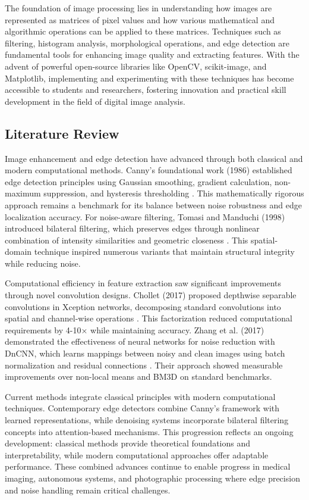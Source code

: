 \documentclass[a4paper, journal]{IEEEtran}
\begin{document}
The foundation of image processing lies in understanding how images are represented as matrices of pixel values and how various mathematical and algorithmic operations can be applied to these matrices. Techniques such as filtering, histogram analysis, morphological operations, and edge detection are fundamental tools for enhancing image quality and extracting features. With the advent of powerful open-source libraries like OpenCV, scikit-image, and Matplotlib, implementing and experimenting with these techniques has become accessible to students and researchers, fostering innovation and practical skill development in the field of digital image analysis.

\subsection{Literature Review}
Image enhancement and edge detection have advanced through both classical and modern computational methods. Canny's foundational work (1986) established edge detection principles using Gaussian smoothing, gradient calculation, non-maximum suppression, and hysteresis thresholding \cite{Canny1986}. This mathematically rigorous approach remains a benchmark for its balance between noise robustness and edge localization accuracy. For noise-aware filtering, Tomasi and Manduchi (1998) introduced bilateral filtering, which preserves edges through nonlinear combination of intensity similarities and geometric closeness \cite{Tomasi1998}. This spatial-domain technique inspired numerous variants that maintain structural integrity while reducing noise.

Computational efficiency in feature extraction saw significant improvements through novel convolution designs. Chollet (2017) proposed depthwise separable convolutions in Xception networks, decomposing standard convolutions into spatial and channel-wise operations \cite{Chollet2017}. This factorization reduced computational requirements by 4-10× while maintaining accuracy. Zhang et al. (2017) demonstrated the effectiveness of neural networks for noise reduction with DnCNN, which learns mappings between noisy and clean images using batch normalization and residual connections \cite{Zhang2017}. Their approach showed measurable improvements over non-local means and BM3D on standard benchmarks.

Current methods integrate classical principles with modern computational techniques. Contemporary edge detectors combine Canny's framework with learned representations, while denoising systems incorporate bilateral filtering concepts into attention-based mechanisms. This progression reflects an ongoing development: classical methods provide theoretical foundations and interpretability, while modern computational approaches offer adaptable performance. These combined advances continue to enable progress in medical imaging, autonomous systems, and photographic processing where edge precision and noise handling remain critical challenges.
\end{document}
